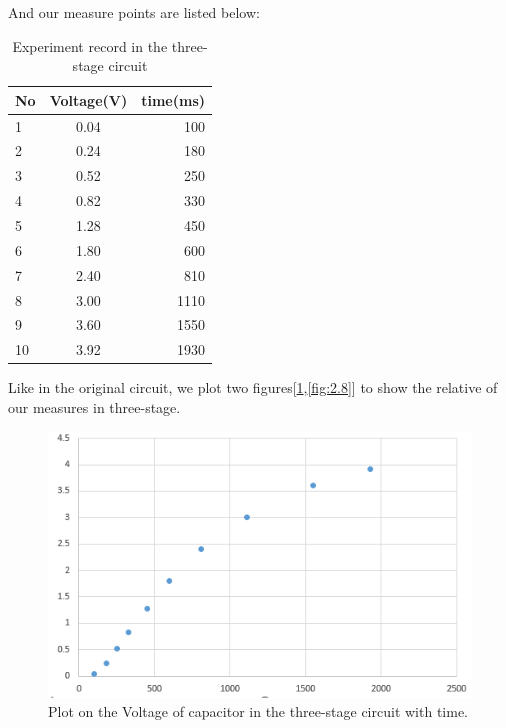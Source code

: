 \phantom{ } And our measure points are listed below:\\

\begin{table}[!htbp]\centering
	\caption{Experiment record in the three-stage circuit}
	\renewcommand\arraystretch{1.5}
	\begin{tabular}{lcr}
		\toprule
		No		&Voltage(V)	&time(ms)	\\
		\midrule
		1		&0.04		&100		\\
		
		2		&0.24		&180		\\
		
		3		&0.52		&250		\\
		
		4		&0.82		&330		\\
		
		5		&1.28		&450		\\
		
		6		&1.80		&600		\\
		
		7		&2.40		&810		\\
		
		8		&3.00		&1110		\\
		
		9		&3.60		&1550		\\
		
		10		&3.92		&1930		\\
		\bottomrule
	\end{tabular}
\end{table}

\phantom{ } Like in the original circuit, we plot two figures[\ref{fig:2.7},\ref{fig:2.8}] to show the relative of our measures in three-stage.

\begin{figure}[!htbp]
	\centering %
	\includegraphics[width=\linewidth]{images/2_7.PNG} %
	\caption{Plot on the Voltage of capacitor in the three-stage circuit with time.} %
	\label{fig:2.7} %
\end{figure}

